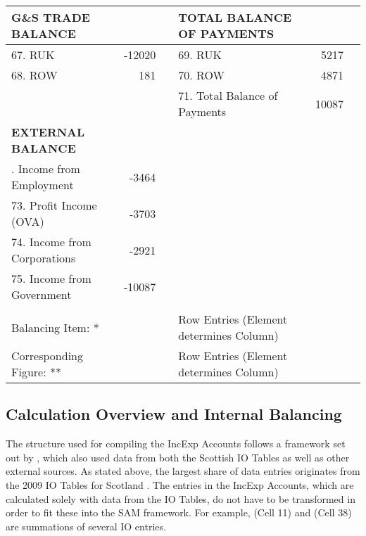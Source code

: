 \begin{table}[H]
\begin{scriptsize}
\begin{centering}
\begin{spacing}{1.2}
\begin{tabular}{lrllrl}
    \textbf{G\&S TRADE BALANCE} & & & \textbf{TOTAL BALANCE OF PAYMENTS} \bigstrut\\
    \hline
       67. RUK & -12020 & & 69. RUK & 5217 &  \\
       68. ROW & 181 & & 70. ROW & 4871 & \\
       & & & 71. Total Balance of Payments & 10087 & \\  
    \hline    
    \textbf{EXTERNAL BALANCE} \bigstrut\\
    \hline
\bigstrut[t]   72. Income from Employment & -3464 & & & & \\
       73. Profit Income (OVA) & -3703 & & & &  \\
       74. Income from Corporations & -2921 & & & & \\
       75. Income from Government & -10087 & & & & \\
    \bottomrule  \bigstrut[b]\\
\qquad \qquad \qquad Balancing Item: *   & & & Row Entries (Element determines Column)  \\
\qquad \qquad \qquad Corresponding Figure: ** & & & Row Entries (Element determines Column)  \bigstrut\\      
   \end{tabular}%
\bigskip \begin{flushright}\end{flushright} \label{tab:2.4.1}
\end{spacing} \end{centering}  \end{scriptsize} \end{table}



\subsection{Calculation Overview and Internal Balancing}
\label{sec:2.4.3}

\bigskip

The structure used for compiling the IncExp Accounts follows a framework set out by , which also used data from both the Scottish IO Tables as well as other external sources. As stated above, the largest share of data entries originates from the 2009 IO Tables for Scotland \cite{ScotGov2013a}. The entries in the IncExp Accounts, which are calculated solely with data from the IO Tables, do not have to be transformed in order to fit these into the SAM framework. For example, (Cell 11) and (Cell 38) are summations of several IO entries.

